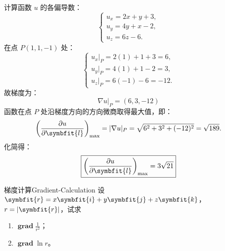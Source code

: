 \begin{solution}
    计算函数 $u$ 的各偏导数：
    \begin{equation}
        \begin{cases}
            u_x = 2x + y + 3, \\
            u_y = 4y + x - 2, \\
            u_z = 6z - 6.
        \end{cases}
    \end{equation}
    在点 $P(1, 1, -1)$ 处：
    \begin{equation}
        \begin{cases}
            u_x|_P = 2(1) + 1 + 3 = 6, \\
            u_y|_P = 4(1) + 1 - 2 = 3, \\
            u_z|_P = 6(-1) - 6 = -12.
        \end{cases}
    \end{equation}
    故梯度为：
    \begin{equation}
        \boxed{\nabla u|_P = (6, 3, -12)}
    \end{equation}
    函数在点 $P$ 处沿梯度方向的方向微商取得最大值，即：
    \begin{equation}
        \left( \frac{\partial u}{\partial \symbfit{l}} \right)_{\max} = |\nabla u|_P = \sqrt{6^2 + 3^2 + (-12)^2} = \sqrt{189}.
    \end{equation}
    化简得：
    \begin{equation}
        \boxed{\left( \frac{\partial u}{\partial \symbfit{l}} \right)_{\max} = 3\sqrt{21}}
    \end{equation}
\end{solution}


\begin{problem}{梯度计算}{Gradient-Calculation}
    设 $\symbfit{r} = x\symbfit{i} + y\symbfit{j} + z\symbfit{k}$，$r = |\symbfit{r}|$，试求
    \begin{enumerate}
        \item $\operatorname{\symbf{grad}} \frac{1}{r^2}$；
        \item $\operatorname{\symbf{grad}} \ln r$。
    \end{enumerate}
\end{problem}

